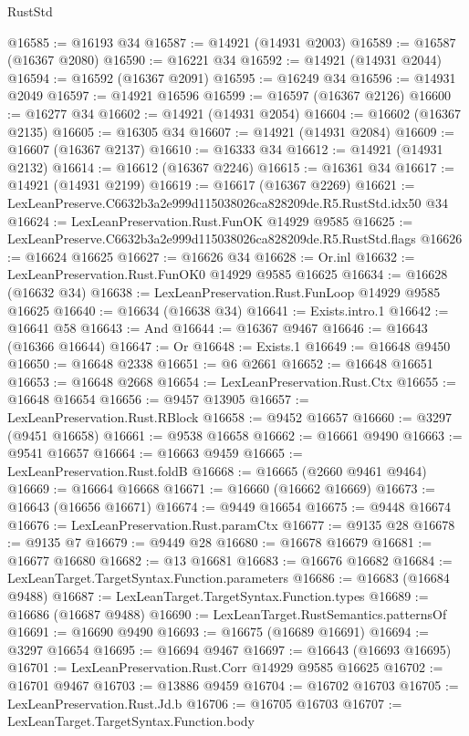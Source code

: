 \begin{lexlean}{RustStd}
\begin{coremodule}
@16585 := @16193 @34
@16587 := @14921 (@14931 @2003)
@16589 := @16587 (@16367 @2080)
@16590 := @16221 @34
@16592 := @14921 (@14931 @2044)
@16594 := @16592 (@16367 @2091)
@16595 := @16249 @34
@16596 := @14931 @2049
@16597 := @14921 @16596
@16599 := @16597 (@16367 @2126)
@16600 := @16277 @34
@16602 := @14921 (@14931 @2054)
@16604 := @16602 (@16367 @2135)
@16605 := @16305 @34
@16607 := @14921 (@14931 @2084)
@16609 := @16607 (@16367 @2137)
@16610 := @16333 @34
@16612 := @14921 (@14931 @2132)
@16614 := @16612 (@16367 @2246)
@16615 := @16361 @34
@16617 := @14921 (@14931 @2199)
@16619 := @16617 (@16367 @2269)
@16621 := LexLeanPreserve.C6632b3a2e999d115038026ca828209de.R5.RustStd.idx50 @34
@16624 := LexLeanPreservation.Rust.FunOK @14929 @9585
@16625 := LexLeanPreserve.C6632b3a2e999d115038026ca828209de.R5.RustStd.flags
@16626 := @16624 @16625
@16627 := @16626 @34
@16628 := Or.inl
@16632 := LexLeanPreservation.Rust.FunOK0 @14929 @9585 @16625
@16634 := @16628 (@16632 @34)
@16638 := LexLeanPreservation.Rust.FunLoop @14929 @9585 @16625
@16640 := @16634 (@16638 @34)
@16641 := Exists.intro.{1}
@16642 := @16641 @58
@16643 := And
@16644 := @16367 @9467
@16646 := @16643 (@16366 @16644)
@16647 := Or
@16648 := Exists.{1}
@16649 := @16648 @9450
@16650 := @16648 @2338
@16651 := @6 @2661
@16652 := @16648 @16651
@16653 := @16648 @2668
@16654 := LexLeanPreservation.Rust.Ctx
@16655 := @16648 @16654
@16656 := @9457 @13905
@16657 := LexLeanPreservation.Rust.RBlock
@16658 := @9452 @16657
@16660 := @3297 (@9451 @16658)
@16661 := @9538 @16658
@16662 := @16661 @9490
@16663 := @9541 @16657
@16664 := @16663 @9459
@16665 := LexLeanPreservation.Rust.foldB
@16668 := @16665 (@2660 @9461 @9464)
@16669 := @16664 @16668
@16671 := @16660 (@16662 @16669)
@16673 := @16643 (@16656 @16671)
@16674 := @9449 @16654
@16675 := @9448 @16674
@16676 := LexLeanPreservation.Rust.paramCtx
@16677 := @9135 @28
@16678 := @9135 @7
@16679 := @9449 @28
@16680 := @16678 @16679
@16681 := @16677 @16680
@16682 := @13 @16681
@16683 := @16676 @16682
@16684 := LexLeanTarget.TargetSyntax.Function.parameters
@16686 := @16683 (@16684 @9488)
@16687 := LexLeanTarget.TargetSyntax.Function.types
@16689 := @16686 (@16687 @9488)
@16690 := LexLeanTarget.RustSemantics.patternsOf
@16691 := @16690 @9490
@16693 := @16675 (@16689 @16691)
@16694 := @3297 @16654
@16695 := @16694 @9467
@16697 := @16643 (@16693 @16695)
@16701 := LexLeanPreservation.Rust.Corr @14929 @9585 @16625
@16702 := @16701 @9467
@16703 := @13886 @9459
@16704 := @16702 @16703
@16705 := LexLeanPreservation.Rust.Jd.b
@16706 := @16705 @16703
@16707 := LexLeanTarget.TargetSyntax.Function.body

\end{coremodule}
\end{lexlean}
